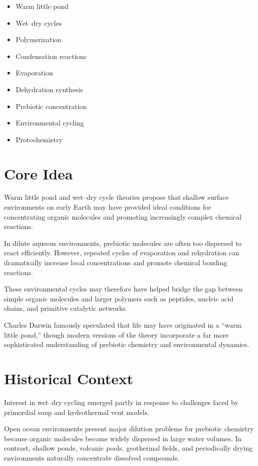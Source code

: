 \documentclass[
  oneside]{book}
\providecommand{\tightlist}{%
  \setlength{\itemsep}{0pt}\setlength{\parskip}{0pt}}
\begin{document}
\begin{itemize}
\tightlist
\item
  Warm little pond
\item
  Wet--dry cycles
\item
  Polymerization
\item
  Condensation reactions
\item
  Evaporation
\item
  Dehydration synthesis
\item
  Prebiotic concentration
\item
  Environmental cycling
\item
  Protochemistry
\end{itemize}

\section{Core Idea}\label{core-idea-4}

Warm little pond and wet--dry cycle theories propose that shallow surface environments on early Earth may have provided ideal conditions for concentrating organic molecules and promoting increasingly complex chemical reactions.

In dilute aqueous environments, prebiotic molecules are often too dispersed to react efficiently. However, repeated cycles of evaporation and rehydration can dramatically increase local concentrations and promote chemical bonding reactions.

These environmental cycles may therefore have helped bridge the gap between simple organic molecules and larger polymers such as peptides, nucleic acid chains, and primitive catalytic networks.

Charles Darwin famously speculated that life may have originated in a ``warm little pond,'' though modern versions of the theory incorporate a far more sophisticated understanding of prebiotic chemistry and environmental dynamics.

\section{Historical Context}\label{historical-context-4}

Interest in wet--dry cycling emerged partly in response to challenges faced by primordial soup and hydrothermal vent models.

Open ocean environments present major dilution problems for prebiotic chemistry because organic molecules become widely dispersed in large water volumes. In contrast, shallow ponds, volcanic pools, geothermal fields, and periodically drying environments naturally concentrate dissolved compounds.
\end{document}
